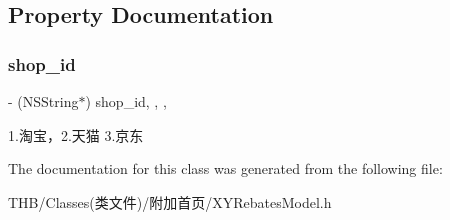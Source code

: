  

\subsection{Property Documentation}
\mbox{\label{interface_x_y_rebates_model_a1931d10855f07e3e39fca1631715fea1}} 
\subsubsection{\texorpdfstring{shop\+\_\+id}{shop\_id}}
{\footnotesize\ttfamily -\/ (N\+S\+String$\ast$) shop\+\_\+id\hspace{0.3cm}{\ttfamily [read]}, {\ttfamily [write]}, {\ttfamily [nonatomic]}, {\ttfamily [copy]}}

1.淘宝，2.\+天猫 3.京东 

The documentation for this class was generated from the following file\+:\begin{DoxyCompactItemize}
\item 
T\+H\+B/\+Classes(类文件)/附加首页/X\+Y\+Rebates\+Model.\+h\end{DoxyCompactItemize}
